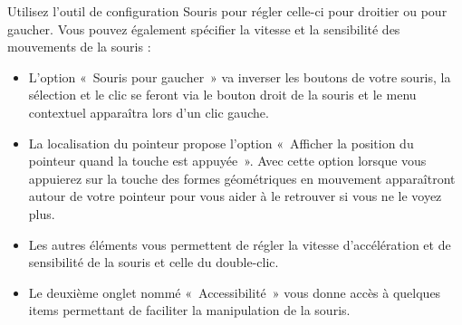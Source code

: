 Utilisez l'outil de configuration Souris pour régler celle-ci pour droitier ou pour gaucher. Vous pouvez également spécifier la vitesse et la sensibilité des mouvements de la souris :
\begin{itemize}
\item L'option «~Souris pour gaucher~» va inverser les boutons de votre souris, la sélection et le clic se feront via le bouton droit de la souris et le menu contextuel apparaîtra lors d'un clic gauche.
\item La localisation du pointeur propose l'option «~Afficher la position du pointeur quand la touche  est appuyée~». Avec cette option lorsque vous appuierez sur la touche  des formes géométriques en mouvement apparaîtront autour de votre pointeur pour vous aider à le retrouver si vous ne le voyez plus.
\item Les autres éléments vous permettent de régler la vitesse d'accélération et de sensibilité de la souris et celle du double-clic.
\item Le deuxième onglet nommé «~Accessibilité~» vous donne accès à quelques items permettant de faciliter la manipulation de la souris.
\end{itemize}
